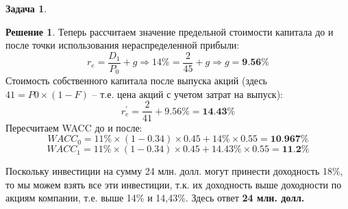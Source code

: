 \documentclass[a4paper, 14pt]{article}
\theoremstyle{plain} %
\theoremstyle{definition} %
\newtheorem*{solution}{Решение}
\newtheorem{problem}{Задача}[subsection]
\theoremstyle{remark} %
\begin{document}
\begin{problem}
\begin{solution}
		Теперь рассчитаем значение предельной стоимости капитала до и после точки использования нераспределенной прибыли:
		\[
			r_e = \frac{D_1}{P_0} + g \Rightarrow 14\% = \frac{2}{45} + g \Rightarrow g = \textbf{9.56\%}
		\]
		Стоимость собственного капитала после выпуска акций (здесь $41 = P0\times (1-F)$  – т.е. цена акций с учетом затрат на выпуск):
		\[
			r_e^{\prime} = \frac{2}{41} + 9.56\% = \textbf{14.43\%}
		\]
		Пересчитаем WACC до и после:
		\[
			WACC_0 = 11\% \times (1-0.34) \times 0.45 + 14\% \times 0.55 = \textbf{10.967\%}
		\]
		\[
			WACC_1 = 11\% \times (1-0.34) \times 0.45 + 14.43\% \times 0.55 = \textbf{11.2\%}
		\]

		Поскольку инвестиции на сумму 24 млн. долл. могут принести доходность 18\%, то мы можем взять все эти инвестиции, т.к. их доходность выше доходности по акциям компании, т.е. выше 14\% и 14,43\%.
		Здесь ответ \textbf{24 млн. долл.}
	\end{solution}
\end{problem}
\end{document}
